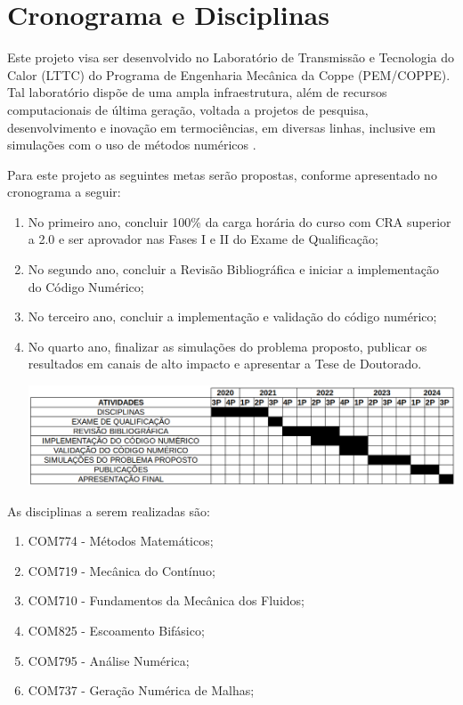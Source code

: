 \section{Cronograma e Disciplinas}

Este projeto visa ser desenvolvido no Laboratório de Transmissão e Tecnologia do Calor (LTTC) do Programa de Engenharia Mecânica da Coppe (PEM/COPPE). 
Tal laboratório dispõe de uma ampla infraestrutura, 
além de recursos computacionais de última geração, 
voltada a projetos de pesquisa, desenvolvimento e inovação
em termociências, em diversas linhas, 
inclusive em simulações com o uso de métodos numéricos \cite{lttccoppe}. 

\bigskip
Para este projeto as seguintes metas serão propostas, conforme apresentado no cronograma a seguir:

\begin{enumerate}

\item No primeiro ano, concluir 100\% da carga horária do curso com CRA superior a 2.0 e ser aprovador nas Fases I e II do Exame de Qualificação;

\item No segundo ano, concluir a Revisão Bibliográfica e iniciar a implementação do Código Numérico;

\item No terceiro ano, concluir a implementação e validação do código numérico;

\item No quarto ano, finalizar as simulações do problema proposto, publicar os resultados em canais de alto impacto e apresentar a Tese de Doutorado.

\hspace{-1.2cm}
\includegraphics[scale=0.44]{figure/cronograma.png}

\end{enumerate}

\bigskip
As disciplinas a serem realizadas são:

\begin{enumerate}
\item COM774 - Métodos Matemáticos; 
\item COM719 - Mecânica do Contínuo;
\item COM710 - Fundamentos da Mecânica dos Fluidos;
\item COM825 - Escoamento Bifásico;
\item COM795 - Análise Numérica;
\item COM737 - Geração Numérica de Malhas;
\end{enumerate}
